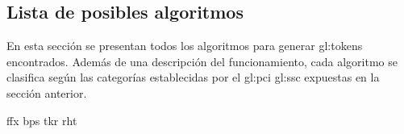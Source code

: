%
%

\subsection{Lista de posibles algoritmos}

En esta sección se presentan todos los algoritmos para generar
\glspl{gl:token} encontrados. Además de una descripción del funcionamiento,
cada algoritmo se clasifica según las categorías establecidas por el
\gls{gl:pci} \gls{gl:ssc} expuestas en la sección anterior.


{ffx}
{bps}
{tkr}
{rht}
